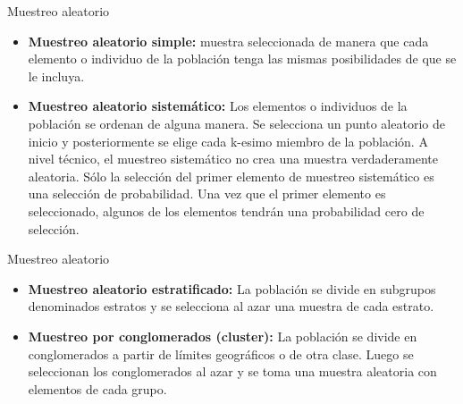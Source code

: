 \documentclass{beamer}
\begin{document}
\begin{frame}{Muestreo aleatorio} 

\begin{itemize}
    \item {\bf  Muestreo aleatorio simple:} muestra seleccionada de manera que cada elemento o individuo de la población tenga las mismas posibilidades de que se le incluya.
    \item {\bf Muestreo aleatorio sistemático:} Los elementos o individuos de la población se ordenan de alguna manera. Se selecciona un punto aleatorio de inicio y posteriormente se elige cada k-esimo miembro de la población. 
A nivel técnico, el muestreo sistemático no crea una muestra verdaderamente aleatoria. Sólo la selección del primer elemento de muestreo sistemático es una selección de probabilidad. Una vez que el primer elemento es seleccionado, algunos de los elementos tendrán una probabilidad cero de selección.
\end{itemize}
 
\end{frame}
 

\begin{frame}{Muestreo aleatorio}
\begin{itemize}
    \item {\bf Muestreo aleatorio estratificado:} La población se divide en subgrupos denominados estratos y se selecciona al azar una muestra de cada estrato.
    \item {\bf  Muestreo por conglomerados (cluster):} La población se divide en conglomerados a partir de límites geográficos o de otra clase. Luego se seleccionan los conglomerados al azar y se toma una muestra aleatoria con elementos de cada grupo. 
\end{itemize}
 \end{frame}   
\end{document}
